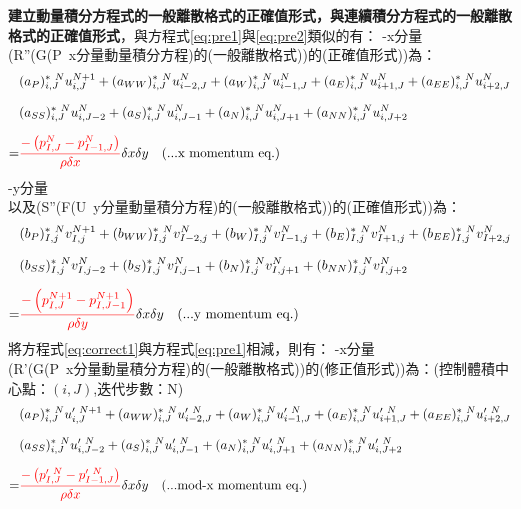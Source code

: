 \documentclass[12pt]{article}
\theoremstyle{upright}
\begin{document}
\textbf{建立動量積分方程式的一般離散格式的正確值形式，與連續積分方程式的一般離散格式的正確值形式}，與方程式\eqref{eq:pre1}與\eqref{eq:pre2}類似的有：
\noindent -x分量\\
\noindent (R''(G(P\ x分量動量積分方程)的(一般離散格式))的(正確值形式))為：
\begin{equation}\label{eq:correct1}\begin{split}
    &(a_{P})_{i,J}^{*\ N}u_{i,J}^{N+1} + (a_{WW})_{i,J}^{*\ N}u_{i-2,J}^{N} + (a_{W})_{i,J}^{*\ N}u_{i-1,J}^{N} + (a_{E})_{i,J}^{*\ N}u_{i+1,J}^{N} + (a_{EE})_{i,J}^{*\ N}u_{i+2,J}^{N} \\[1.5ex]
    &(a_{SS})_{i,J}^{*\ N}u_{i,J-2}^{N} + (a_{S})_{i,J}^{*\ N}u_{i,J-1}^{N} + (a_{N})_{i,J}^{*\ N}u_{i,J+1}^{N} + (a_{NN})_{i,J}^{*\ N}u_{i,J+2}^{N} \\[1.5ex]
   =& {\color{red}\frac{-\left(p_{I,J}^{N}  - p_{I-1,J}^{N}\right)}{\rho  \delta x}}\delta x \delta y \quad \text{(...x momentum eq.)} 
\end{split}\end{equation}
\noindent -y分量\\
\noindent 以及(S''(F(U\ y分量動量積分方程)的(一般離散格式))的(正確值形式))為：
\begin{equation}\label{eq:correct2}\begin{split}
    &(b_{P})_{I,j}^{*\ N}v_{I,j}^{N+1}  + (b_{WW})_{I,j}^{*\ N}v_{I-2,j}^{N}  + (b_{W})_{I,j}^{*\ N}v_{I-1,j}^{N}  + (b_{E})_{I,j}^{*\ N}v_{I+1,j}^{N}  + (b_{EE})_{I,j}^{*\ N}v_{I+2,j}^{N}  \\[1.5ex]
    &(b_{SS})_{I,j}^{*\ N}v_{I,j-2}^{N}  + (b_{S})_{I,j}^{*\ N}v_{I,j-1}^{N}  + (b_{N})_{I,j}^{*\ N}v_{I,j+1}^{N}  + (b_{NN})_{I,j}^{*\ N}v_{I,j+2}^{N}  \\[1.5ex]
   =& {\color{red}\frac{-\left(p_{I,J}^{N+1}  - p_{I,J-1}^{N+1}\right)}{\rho  \delta y}}\delta x \delta y\quad \text{(...y momentum eq.)} 
\end{split}\end{equation}
\noindent 將方程式\eqref{eq:correct1}與方程式\eqref{eq:pre1}相減，則有：
\noindent -x分量\\
\noindent (R'(G(P\ x分量動量積分方程)的(一般離散格式))的(修正值形式))為：(控制體積中心點：$(i,J)$,迭代步數：N)
\begin{equation}\label{eq:mod1}\begin{split}
    &(a_{P})_{i,J}^{*\ N}u_{i,J}^{\prime\ N+1} + (a_{WW})_{i,J}^{*\ N}u_{i-2,J}^{\prime\ N} + (a_{W})_{i,J}^{*\ N}u_{i-1,J}^{\prime\ N} + (a_{E})_{i,J}^{*\ N}u_{i+1,J}^{\prime\ N} + (a_{EE})_{i,J}^{*\ N}u_{i+2,J}^{\prime\ N} \\[1.5ex]
    &(a_{SS})_{i,J}^{*\ N}u_{i,J-2}^{\prime\ N} + (a_{S})_{i,J}^{*\ N}u_{i,J-1}^{\prime\ N} + (a_{N})_{i,J}^{*\ N}u_{i,J+1}^{\prime\ N} + (a_{NN})_{i,J}^{*\ N}u_{i,J+2}^{\prime\ N} \\[1.5ex]
   =& {\color{red}\frac{-\left(p_{I,J}^{\prime\ N} - p_{I-1,J}^{\prime\ N}\right)}{\rho  \delta x}}\delta x \delta y \quad \text{(...mod-x momentum eq.)} 
\end{split}\end{equation}
\end{document}
